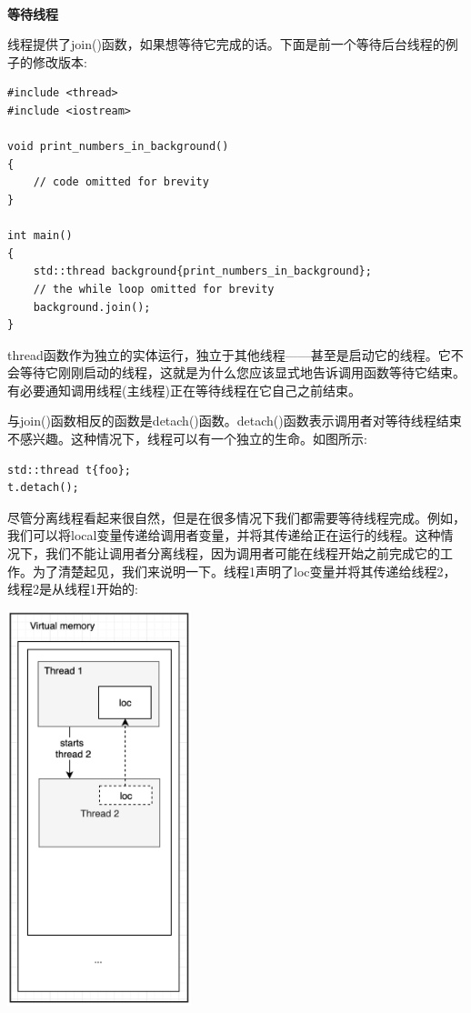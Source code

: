\noindent\textbf{}\ \par
\textbf{等待线程} \ \par
线程提供了join()函数，如果想等待它完成的话。下面是前一个等待后台线程的例子的修改版本: \par

\begin{lstlisting}[caption={}]
#include <thread>
#include <iostream>

void print_numbers_in_background()
{
	// code omitted for brevity
}

int main()
{
	std::thread background{print_numbers_in_background};
	// the while loop omitted for brevity
	background.join();
}
\end{lstlisting}

thread函数作为独立的实体运行，独立于其他线程——甚至是启动它的线程。它不会等待它刚刚启动的线程，这就是为什么您应该显式地告诉调用函数等待它结束。有必要通知调用线程(主线程)正在等待线程在它自己之前结束。 \par
与join()函数相反的函数是detach()函数。detach()函数表示调用者对等待线程结束不感兴趣。这种情况下，线程可以有一个独立的生命。如图所示: \par

\begin{lstlisting}[caption={}]
std::thread t{foo};
t.detach();
\end{lstlisting}

尽管分离线程看起来很自然，但是在很多情况下我们都需要等待线程完成。例如，我们可以将local变量传递给调用者变量，并将其传递给正在运行的线程。这种情况下，我们不能让调用者分离线程，因为调用者可能在线程开始之前完成它的工作。为了清楚起见，我们来说明一下。线程1声明了loc变量并将其传递给线程2，线程2是从线程1开始的: \par

\begin{center}
	\includegraphics[width=0.4\textwidth]{content/Section-2/Chapter-8/12}
\end{center}

